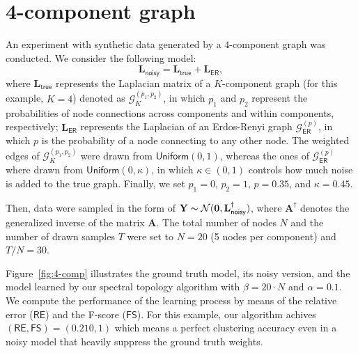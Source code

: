 \section{4-component graph}
An experiment with synthetic data generated by a 4-component graph was conducted.
We consider the following model:
\begin{equation}
  \mathbf{L}_{\mathsf{noisy}} = \mathbf{L}_{\mathsf{true}} + \mathbf{L}_{\mathsf{ER}},
  \label{eq:model}
\end{equation}
where $\mathbf{L}_{\mathsf{true}}$ represents the Laplacian matrix of a $K$-component graph (for this example, $K = 4$)
denoted as $\mathcal{G}^{(p_1, p_2)}_K$,
in which $p_1$ and $p_2$ represent the probabilities of node connections across components and within components, respectively;
$\mathbf{L}_{\mathsf{ER}}$ represents the Laplacian of an Erdos-Renyi graph $\mathcal{G}^{(p)}_{\mathsf{ER}}$, in which $p$
is the probability of a node connecting to any other node. The weighted edges of $\mathcal{G}^{(p_1, p_2)}_K$
were drawn from $\textsf{Uniform}(0, 1)$, whereas the ones of $\mathcal{G}^{(p)}_{\mathsf{ER}}$ where drawn from
$\textsf{Uniform}(0, \kappa)$, in which $\kappa \in (0, 1)$ controls how much noise is added to the true graph. Finally,
we set $p_1 = 0$, $p_2 = 1$, $p = 0.35$, and $\kappa = 0.45$.

Then, data were sampled in the form of $\mathbf{Y} \thicksim \mathcal{N}(\mathbf{0}, \mathbf{L}_{\mathsf{noisy}}^{\dagger})$,
where $\mathbf{A}^{\dagger}$ denotes the generalized inverse of the matrix $\mathbf{A}$. The total number of nodes $N$
and the number of drawn samples $T$ were set to $N = 20$ (5 nodes per component) and $T / N = 30$.

Figure~\ref{fig:4-comp} illustrates the ground truth model, its noisy version, and the model learned by our spectral
topology algorithm with $\beta = 20 \cdot N$ and $\alpha = 0.1$.
We compute the performance of the learning process by means of the relative error
($\textsf{RE}$) and the F-score ($\textsf{FS}$). For this example, our algorithm achives $(\mathsf{RE}, \mathsf{FS}) = (0.210, 1)$
which means a perfect clustering accuracy even in a noisy model that heavily suppress the ground truth weights.

